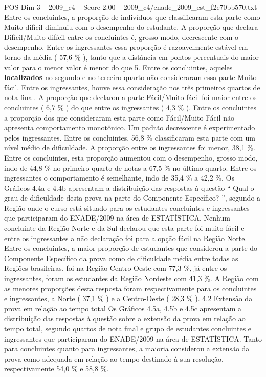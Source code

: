 \begin{textsample}{POS Dim 3 – 2009\_c4 – Score 2.00 – 2009\_c4/enade\_2009\_est\_f2e70bb570.txt}
Entre os concluintes, a proporção de indivíduos que classificaram esta parte como Muito difícil diminuiu com o desempenho do estudante.
A proporção que declara Difícil/Muito difícil entre os concluintes é, grosso modo, decrescente com o desempenho.
Entre os ingressantes essa proporção é razoavelmente estável em torno da média ( 57,6 \% ), tanto que a distância em pontos percentuais do maior valor para o menor valor é menor do que 5.
Entre os concluintes, aqueles \textbf{localizados} no segundo e no terceiro quarto não consideraram essa parte Muito fácil.
Entre os ingressantes, houve essa consideração nos três primeiros quartos de nota final.
A proporção que declarou a parte Fácil/Muito fácil foi maior entre os concluintes ( 6,7 \% ) do que entre os ingressantes ( 4,3 \% ).
Entre os concluintes a proporção dos que consideraram esta parte como Fácil/Muito Fácil não apresenta comportamento monotônico.
Um padrão decrescente é experimentado pelos ingressantes.
Entre os concluintes, 56,8 \% classificaram esta parte com um nível médio de dificuldade.
A proporção entre os ingressantes foi menor, 38,1 \%.
Entre os concluintes, esta proporção aumentou com o desempenho, grosso modo, indo de 44,8 \% no primeiro quarto de notas a 67,5 \% no último quarto.
Entre os ingressantes o comportamento é semelhante, indo de 35,4 \% a 42,2 \%.
Os Gráficos 4.4a e 4.4b apresentam a distribuição das respostas à questão “ Qual o grau de dificuldade desta prova na parte do Componente Específico? ”, segundo a Região onde o curso está situado para os estudantes concluintes e ingressantes que participaram do ENADE/2009 na área de ESTATÍSTICA.
Nenhum concluinte da Região Norte e da Sul declarou que esta parte foi muito fácil e entre os ingressantes a não declaração foi para a opção fácil na Região Norte.
Entre os concluintes, a maior proporção de estudantes que considerou a parte do Componente Específico da prova como de dificuldade média entre todas as Regiões brasileiras, foi na Região Centro-Oeste com 77,3 \%, já entre os ingressantes, foram os estudantes da Região Nordeste com 41,3 \%.
A Região com as menores proporções desta resposta foram respectivamente para os concluintes e ingressantes, a Norte ( 37,1 \% ) e a Centro-Oeste ( 28,3 \% ). 4.2 Extensão da prova em relação ao tempo total Os Gráficos 4.5a, 4.5b e 4.5c apresentam a distribuição das respostas à questão sobre a extensão da prova em relação ao tempo total, segundo quartos de nota final e grupo de estudantes concluintes e ingressantes que participaram do ENADE/2009 na área de ESTATÍSTICA.
Tanto para concluintes quanto para ingressantes, a maioria considerou a extensão da prova como adequada em relação ao tempo destinado à sua resolução, respectivamente 54,0 \% e 58,8 \%.

\end{textsample}
